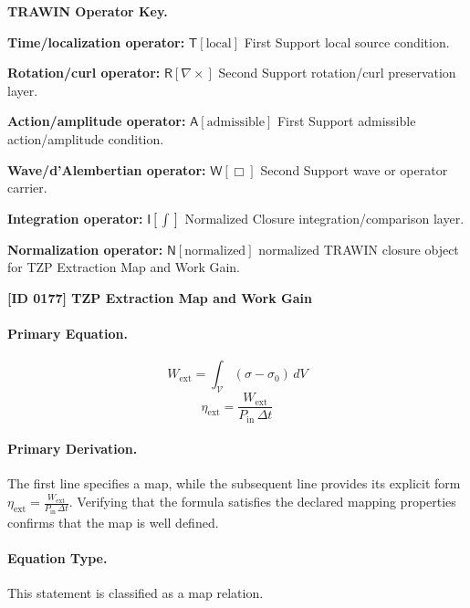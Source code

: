 \par\vspace{0.45\baselineskip}
\noindent\begin{minipage}[t]{\linewidth}
\begingroup
\small
\raggedright
\textbf{TRAWIN Operator Key.}\par
\noindent\textbf{Time/localization operator:} $\mathsf{T}\!\left[\mathrm{local}\right]$ First Support local source condition.\par
\noindent\textbf{Rotation/curl operator:} $\mathsf{R}\!\left[\nabla\times\right]$ Second Support rotation/curl preservation layer.\par
\noindent\textbf{Action/amplitude operator:} $\mathsf{A}\!\left[\mathrm{admissible}\right]$ First Support admissible action/amplitude condition.\par
\noindent\textbf{Wave/d'Alembertian operator:} $\mathsf{W}\!\left[\Box\right]$ Second Support wave or operator carrier.\par
\noindent\textbf{Integration operator:} $\mathsf{I}\!\left[\int\right]$ Normalized Closure integration/comparison layer.\par
\noindent\textbf{Normalization operator:} $\mathsf{N}\!\left[\mathrm{normalized}\right]$ normalized TRAWIN closure object for TZP Extraction Map and Work Gain.\par
\endgroup
\end{minipage}

\clearpage
\noindent\textbf{[ID 0177] TZP Extraction Map and Work Gain}\par
\vspace{0.35em}
\paragraph{Primary Equation.}
\[
W_{\mathrm{ext}} = \int_{\mathcal{V}} (\sigma - \sigma_0)\, dV
\]
\[
\eta_{\mathrm{ext}} = \frac{W_{\mathrm{ext}}}{P_{\mathrm{in}}\,\Delta t}
\]

\paragraph{Primary Derivation.}
The first line specifies a map, while the subsequent line provides its explicit form \( \eta_{\mathrm{ext}} = \frac{W_{\mathrm{ext}}}{P_{\mathrm{in}}\,\Delta t} \). Verifying that the formula satisfies the declared mapping properties confirms that the map is well defined.
\paragraph{Equation Type.}
This statement is classified as a map relation.

